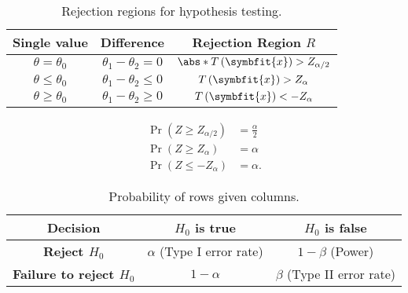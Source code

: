 \documentclass{article}
\begin{document}
\begin{multicols}{2}
    \begin{table}[H]
        \begin{tabular}{ccc}
            \toprule
        Single value             & Difference                     & \textbf{Rejection Region} \(R\)                       \\
        \midrule
        \(\theta = \theta_0\)    & \(\theta_1 - \theta_2 = 0\)    & \(\abs*{T\left( \symbfit{x} \right)} > Z_{\alpha/2}\) \\
        \(\theta \leq \theta_0\) & \(\theta_1 - \theta_2 \leq 0\) & \(T\left( \symbfit{x} \right) > Z_{\alpha}\)          \\
        \(\theta \geq \theta_0\) & \(\theta_1 - \theta_2 \geq 0\) & \(T\left( \symbfit{x} \right) < -Z_{\alpha}\)         \\
        \bottomrule
    \end{tabular}
    \caption{Rejection regions for hypothesis testing.}
\end{table}
\begin{align*}
    \Pr{\left( Z \geq Z_{\alpha / 2} \right)} & = \frac{\alpha}{2} \\
    \Pr{\left( Z \geq Z_{\alpha} \right)}     & = \alpha           \\
    \Pr{\left( Z \leq -Z_{\alpha} \right)}    & = \alpha.
\end{align*}
\end{multicols}
\begin{table}[H]
    \centering
    \begin{tabular}{c|cc}
        \toprule
        \textbf{Decision}   & \textbf{\(H_0\) is true}       & \textbf{\(H_0\) is false}      \\
        \midrule
        \textbf{Reject \(H_0\)}            & \(\alpha\) (Type I error rate) & \(1 - \beta\) (Power)          \\
        \textbf{Failure to reject \(H_0\)} & \(1 - \alpha\)                 & \(\beta\) (Type II error rate) \\
        \bottomrule
    \end{tabular}
    \caption{Probability of rows given columns.}
\end{table}
\end{document}
